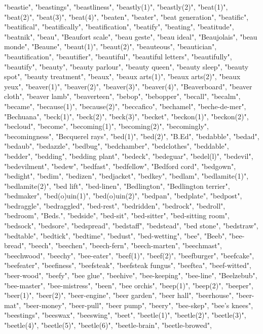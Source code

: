 "beastie",
"beastings",
"beastliness",
"beastly(1)",
"beastly(2)",
"beat(1)",
"beat(2)",
"beat(3)",
"beat(4)",
"beaten",
"beater",
"beat generation",
"beatific",
"beatifical",
"beatifically",
"beatification",
"beatify",
"beating",
"beatitude",
"beatnik",
"beau",
"Beaufort scale",
"beau geste",
"beau ideal",
"Beaujolais",
"beau monde",
"Beaune",
"beaut(1)",
"beaut(2)",
"beauteous",
"beautician",
"beautification",
"beautifier",
"beautiful",
"beautiful letters",
"beautifully",
"beautify",
"beauty",
"beauty parlour",
"beauty queen",
"beauty sleep",
"beauty spot",
"beauty treatment",
"beaux",
"beaux arts(1)",
"beaux arts(2)",
"beaux yeux",
"beaver(1)",
"beaver(2)",
"beaver(3)",
"beaver(4)",
"Beaverboard",
"beaver cloth",
"beaver lamb",
"beaverteen",
"bebop",
"bebopper",
"becall",
"becalm",
"became",
"because(1)",
"because(2)",
"beccafico",
"bechamel",
"beche-de-mer",
"Bechuana",
"beck(1)",
"beck(2)",
"beck(3)",
"becket",
"beckon(1)",
"beckon(2)",
"becloud",
"become",
"becoming(1)",
"becoming(2)",
"becomingly",
"becomingness",
"Becquerel rays",
"bed(1)",
"bed(2)",
"B.Ed",
"bedabble",
"bedad",
"bedaub",
"bedazzle",
"bedbug",
"bedchamber",
"bedclothes",
"beddable",
"bedder",
"bedding",
"bedding plant",
"bedeck",
"bedeguar",
"bedel(l)",
"bedevil",
"bedevilment",
"bedew",
"bedfast",
"bedfellow",
"Bedford cord",
"bedgown",
"bedight",
"bedim",
"bedizen",
"bedjacket",
"bedkey",
"bedlam",
"bedlamite(1)",
"bedlamite(2)",
"bed lift",
"bed-linen",
"Bedlington",
"Bedlington terrier",
"bedmaker",
"bed(o)uin(1)",
"bed(o)uin(2)",
"bedpan",
"bedplate",
"bedpost",
"bedraggle",
"bedraggled",
"bed-rest",
"bedridden",
"bedrock",
"bedroll",
"bedroom",
"Beds.",
"bedside",
"bed-sit",
"bed-sitter",
"bed-sitting room",
"bedsock",
"bedsore",
"bedspread",
"bedstaff",
"bedstead",
"bed stone",
"bedstraw",
"bedtable",
"bedtick",
"bedtime",
"bedust",
"bed-wetting",
"bee",
"Beeb",
"bee-bread",
"beech",
"beechen",
"beech-fern",
"beech-marten",
"beechmast",
"beechwood",
"beechy",
"bee-eater",
"beef(1)",
"beef(2)",
"beefburger",
"beefcake",
"beefeater",
"beefiness",
"beefsteak",
"beefsteak fungus",
"beeftea",
"beef-witted",
"beer-wood",
"beefy",
"bee glue",
"beehive",
"bee-keeping",
"bee-line",
"Beelzebub",
"bee-master",
"bee-mistress",
"been",
"bee orchis",
"beep(1)",
"beep(2)",
"beeper",
"beer(1)",
"beer(2)",
"beer-engine",
"beer garden",
"beer hall",
"beerhouse",
"beer-mat",
"beer-money",
"beer-pull",
"beer pump",
"beery",
"bee-skep",
"bee's knees",
"beestings",
"beeswax",
"beeswing",
"beet",
"beetle(1)",
"beetle(2)",
"beetle(3)",
"beetle(4)",
"beetle(5)",
"beetle(6)",
"beetle-brain",
"beetle-browed",
